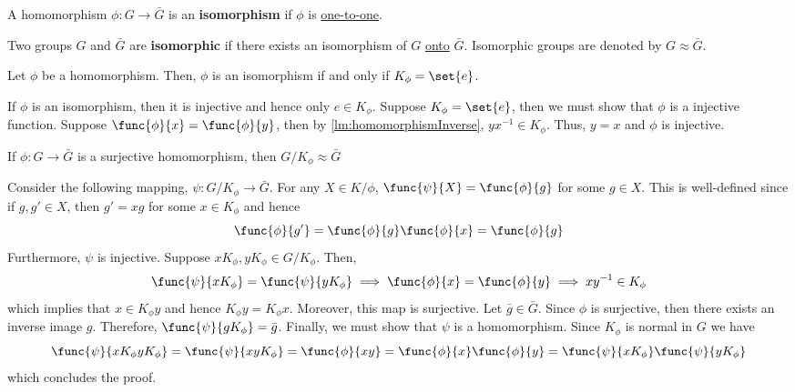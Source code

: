 \begin{definition}
    A homomorphism \(\phi: G \to \bar{G}\) is an \textbf{isomorphism} if \(\phi\) is \underline{one-to-one}.
\end{definition}

\begin{definition}
    Two groups \(G\) and \(\bar{G}\) are \textbf{isomorphic} if there exists an isomorphism of \(G\) \underline{onto} \(\bar{G}\). Isomorphic groups are denoted by \(G \approx \bar{G}\).
\end{definition}

\begin{corollary}
    Let \(\phi\) be a homomorphism. Then, \(\phi\) is an isomorphism if and only if \(K_{\phi} = \set{e}\).
\end{corollary}

\begin{prooflemma}
    If \(\phi\) is an isomorphism, then it is injective and hence only \(e \in K_{\phi}\). Suppose \(K_{\phi} = \set{e}\), then we must show that \(\phi\) is a injective function. Suppose \(\func{\phi}{x} = \func{\phi}{y}\), then by \ref{lm:homomorphismInverse}, \(y x^{-1} \in K_{\phi}\). Thus, \(y = x\) and \(\phi\) is injective.
\end{prooflemma}

\begin{theorem}\label{thm:surjectiveHomomorphism}
    If \(\phi: G \to \bar{G}\) is a surjective homomorphism, then \(G/K_{\phi} \approx \bar{G}\)
\end{theorem}

\begin{prooflemma}
    Consider the following mapping, \(\psi: G/K_{\phi} \to \bar{G}\). For any \(X \in K/\phi\), \(\func{\psi}{X} = \func{\phi}{g}\) for some \(g \in X\). This is well-defined since if \(g,g' \in X\), then \(g' = xg\) for some \(x \in K_{\phi}\) and hence 
    \begin{equation*}
        \func{\phi}{g'} = \func{\phi}{g} \func{\phi}{x} = \func{\phi}{g}
    \end{equation*}
    Furthermore, \(\psi\) is injective. Suppose \(xK_{\phi},yK_{\phi} \in G/K_{\phi}\). Then,
    \begin{equation*}
        \func{\psi}{xK_{\phi}} = \func{\psi}{yK_{\phi}} \implies \func{\phi}{x} = \func{\phi}{y} \implies xy^{-1} \in K_{\phi}
    \end{equation*}
    which implies that \(x \in K_{\phi} y\) and hence \(K_{\phi} y = K_{\phi} x\). Moreover, this map is surjective. Let \(\bar{g} \in \bar{G}\). Since \(\phi\) is surjective, then there exists an inverse image \(g\). Therefore, \(\func{\psi}{gK_{\phi}} = \bar{g}\). Finally, we must show that \(\psi\) is a homomorphism. Since \(K_{\phi}\) is normal in \(G\) we have 
    \begin{equation*}
        \func{\psi}{xK_{\phi} y K_{\phi}} = \func{\psi}{xy K_{\phi}}= \func{\phi}{xy} = \func{\phi}{x}\func{\phi}{y} = \func{\psi}{xK_{\phi}} \func{\psi}{yK_{\phi}}
    \end{equation*}
    which concludes the proof.
\end{prooflemma}

